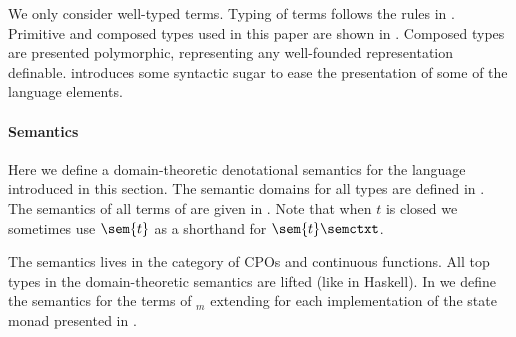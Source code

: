 
We only consider well-typed terms.
%
Typing of terms follows the rules in .
%
Primitive and composed types used in this paper are shown in
.
%
Composed types are presented polymorphic, representing any
well-founded representation definable.
%
 introduces some syntactic sugar to ease the
presentation of some of the language elements.



\paragraph{Semantics}
\label{sec:semantics}



Here we define a domain-theoretic denotational semantics for the
language introduced in this section.
%
The semantic domains for all types are defined in
.
%
The semantics of all terms of \lang{} are given in
.
%
Note that when $t$ is closed we sometimes use $\sem{t}$ as
a shorthand for $\sem{t} \semctxt$.


The semantics lives in the category \CPO{} of CPOs and continuous
functions.
%
All top types in the domain-theoretic semantics are lifted (like in
Haskell).
%
In  we define the semantics for the
terms of \lang$_m$ extending \lang{} for each implementation of the
state monad presented in .


